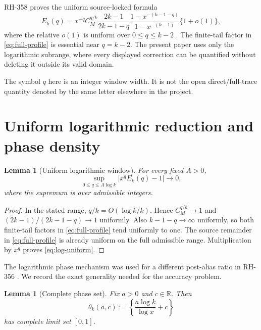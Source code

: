 \documentclass[11pt]{article}
\newtheorem{lemma}[theorem]{Lemma}
\theoremstyle{remark}
\begin{document}
RH-358 proves the uniform source-locked formula
\begin{equation}\label{eq:full-profile}
 E_k(q)=x^{-q}C_M^{q/k}\frac{2k-1}{2k-1-q}
 \frac{1-x^{-(k-1-q)}}{1-x^{-(k-1)}}\{1+o(1)\},
\end{equation}
where the relative $o(1)$ is uniform over $0\le q\le k-2$
\citep{WangTerminalLag2026}.  The finite-tail factor in
\eqref{eq:full-profile} is essential near $q=k-2$.  The present paper uses
only the logarithmic subrange, where every displayed correction can be
quantified without deleting it outside its valid domain.

The symbol $q$ here is an integer window width.  It is not the open
direct/full-trace quantity denoted by the same letter elsewhere in the
project.

\section{Uniform logarithmic reduction and phase density}

\begin{lemma}[Uniform logarithmic window]\label{lem:log-window}
For every fixed $A>0$,
\begin{equation}\label{eq:log-uniform}
 \sup_{0\le q\le A\log k}
 \left|x^qE_k(q)-1\right|\longrightarrow0,
\end{equation}
where the supremum is over admissible integers.
\end{lemma}

\begin{proof}
In the stated range, $q/k=O(\log k/k)$.  Hence
$C_M^{q/k}\to1$ and $(2k-1)/(2k-1-q)\to1$ uniformly.  Also
$k-1-q\to\infty$ uniformly, so both finite-tail factors in
\eqref{eq:full-profile} tend uniformly to one.  The source remainder in
\eqref{eq:full-profile} is already uniform on the full admissible range.
Multiplication by $x^q$ proves \eqref{eq:log-uniform}.
\end{proof}

The logarithmic phase mechanism was used for a different post-alias ratio in
RH-356 \citep{WangMesoscopic2026}.  We record the exact generality needed for
the accuracy problem.

\begin{lemma}[Complete phase set]\label{lem:phase}
Fix $a>0$ and $c\in\mathbb R$.  Then
\begin{equation}\label{eq:theta}
 \theta_k(a,c):=
 \left\{\frac{a\log k}{\log x}+c\right\}
\end{equation}
has complete limit set $[0,1]$.
\end{lemma}
\end{document}
